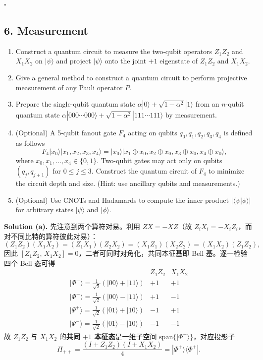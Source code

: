 \documentclass{ctexart}
\newcommand{\ket}[1]{|#1\rangle}
\newcommand{\bra}[1]{\langle #1|}
\newcommand{\braket}[1]{\langle #1\rangle}
\begin{document}
\hfill $\square$

\subsection*{6. Measurement}

\begin{enumerate}
    \item[(a)] Construct a quantum circuit to measure the two-qubit operators $Z_1 Z_2$ and $X_1 X_2$ on $\ket{\psi}$ and project $\ket{\psi}$ onto the joint $+1$ eigenstate of $Z_1 Z_2$ and $X_1 X_2$.
    \item[(b)] Give a general method to construct a quantum circuit to perform projective measurement of any Pauli operator $P$.
    \item[(c)] Prepare the single-qubit quantum state $\alpha\ket{0} + \sqrt{1-\alpha^2}\ket{1}$ from an $n$-qubit quantum state $\alpha\ket{000\cdots000} + \sqrt{1-\alpha^2}\ket{111\cdots111}$ by measurement.
    \item[(d)] (Optional) A 5-qubit fanout gate $F_4$ acting on qubits $q_0, q_1, q_2, q_3, q_4$ is defined as follows
    \begin{equation*}
        F_4 \ket{x_0}\ket{x_1, x_2, x_3, x_4} = \ket{x_0}\ket{x_1 \oplus x_0, x_2 \oplus x_0, x_3 \oplus x_0, x_4 \oplus x_0},
    \end{equation*}
    where $x_0, x_1, \ldots, x_4 \in \{0,1\}$. Two-qubit gates may act only on qubits $(q_j, q_{j+1})$ for $0 \leq j \leq 3$. Construct the quantum circuit of $F_4$ to minimize the circuit depth and size. (Hint: use ancillary qubits and measurements.)
    \item[(e)] (Optional) Use CNOTs and Hadamards to compute the inner product $|\braket{\psi|\phi}|$ for arbitrary states $\ket{\psi}$ and $\ket{\phi}$.
\end{enumerate}

\medskip
\noindent\textbf{Solution (a).} 先注意到两个算符对易。利用 $ZX=-XZ$（故 $Z_iX_i=-X_iZ_i$，而对不同比特的算符彼此对易）：
\begin{equation*}
    (Z_1Z_2)(X_1X_2)=(Z_1X_1)(Z_2X_2)=(X_1Z_1)(X_2Z_2)=(X_1X_2)(Z_1Z_2),
\end{equation*}
因此 $[Z_1Z_2,\,X_1X_2]=0$，二者可同时对角化，共同本征基即 Bell 基。逐一检验四个 Bell 态可得
\begin{equation*}
\begin{array}{c|cc}
 & Z_1Z_2 & X_1X_2\\ \hline
\ket{\Phi^+}=\tfrac{1}{\sqrt2}(\ket{00}+\ket{11}) & +1 & +1\\
\ket{\Phi^-}=\tfrac{1}{\sqrt2}(\ket{00}-\ket{11}) & +1 & -1\\
\ket{\Psi^+}=\tfrac{1}{\sqrt2}(\ket{01}+\ket{10}) & -1 & +1\\
\ket{\Psi^-}=\tfrac{1}{\sqrt2}(\ket{01}-\ket{10}) & -1 & -1
\end{array}
\end{equation*}
故 $Z_1Z_2$ 与 $X_1X_2$ 的\textbf{共同 $+1$ 本征态}是一维子空间 $\mathrm{span}\{\ket{\Phi^+}\}$，对应投影子
\begin{equation*}
    \Pi_{++}=\frac{(I+Z_1Z_2)(I+X_1X_2)}{4}=\ket{\Phi^+}\!\bra{\Phi^+}.
\end{equation*}
\end{document}
